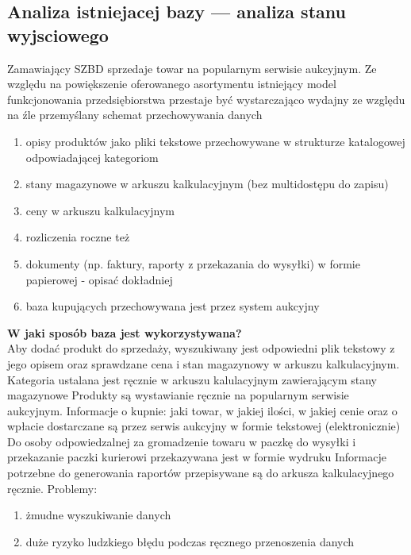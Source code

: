 \subsection{Analiza istniejacej bazy — analiza stanu wyjsciowego}
Zamawiający SZBD sprzedaje towar na popularnym serwisie aukcyjnym. 
Ze względu na powiększenie oferowanego asortymentu istniejący model funkcjonowania przedsiębiorstwa przestaje być wystarczająco wydajny 
ze względu na źle przemyślany schemat przechowywania danych
\begin{enumerate}
\item opisy produktów jako pliki tekstowe przechowywane w strukturze katalogowej odpowiadającej kategoriom
\item stany magazynowe w arkuszu kalkulacyjnym (bez multidostępu do zapisu)
\item ceny w arkuszu kalkulacyjnym
\item rozliczenia roczne też 
\item dokumenty (np. faktury, raporty z przekazania do wysyłki) w formie papierowej - opisać dokładniej
\item baza kupujących przechowywana jest przez system aukcyjny	
\end{enumerate}
\textbf{W jaki sposób baza jest wykorzystywana?}\\
Aby dodać produkt do sprzedaży, wyszukiwany jest odpowiedni plik tekstowy z jego opisem oraz sprawdzane cena i stan magazynowy w arkuszu kalkulacyjnym.
Kategoria ustalana jest ręcznie w arkuszu kalulacyjnym zawierającym stany magazynowe
Produkty są wystawianie ręcznie na popularnym serwisie aukcyjnym.
Informacje o kupnie: jaki towar, w jakiej ilości, w jakiej cenie oraz o wpłacie dostarczane są przez serwis aukcyjny w formie tekstowej (elektronicznie)
Do osoby odpowiedzalnej za gromadzenie towaru w paczkę do wysyłki i przekazanie paczki kurierowi przekazywana jest w formie wydruku
Informacje potrzebne do generowania raportów przepisywane są do arkusza kalkulacyjnego ręcznie.
Problemy: 
\begin{enumerate}
	\item żmudne wyszukiwanie danych
	\item duże ryzyko ludzkiego błędu podczas ręcznego przenoszenia danych 
\end{enumerate}


